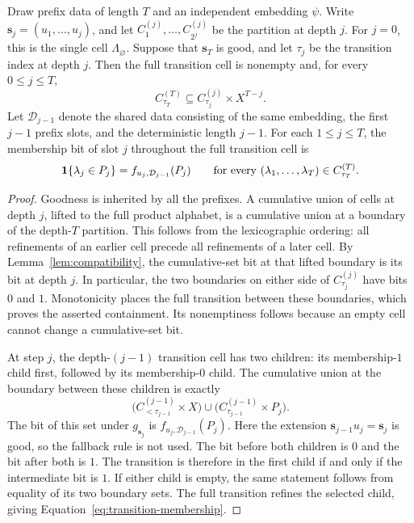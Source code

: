 \begin{lemma}
\label{lem:prefix-refinement}
Draw prefix data of length $T$ and an independent embedding $\psi$.
Write $\mathbf s_j=(u_1,\ldots,u_j)$, and let
$C^{(j)}_1,\ldots,C^{(j)}_{2^j}$ be the partition at depth $j$.
For $j=0$, this is the single cell $\Lambda_{\varnothing}$.
Suppose that $\mathbf s_T$ is good, and let $\tau_j$ be the
transition index at depth $j$.  Then the full transition cell is
nonempty and, for every $0\le j\le T$,
\[
  C^{(T)}_{\tau_T}
  \subseteq C^{(j)}_{\tau_j}\times X^{T-j}.
\]
Let $\mathcal D_{j-1}$ denote the shared data consisting of the same
embedding, the first $j-1$ prefix slots, and the deterministic length
$j-1$.  For each $1\le j\le T$, the membership bit of slot $j$
throughout the full transition cell is
\begin{equation}
  \mathbf 1\{\lambda_j\in P_j\}
  =f_{u_j,\mathcal D_{j-1}}(P_j)
  \qquad
  \text{for every }
  (\lambda_1,\ldots,\lambda_T)\in C^{(T)}_{\tau_T}.
  \label{eq:transition-membership}
\end{equation}
\end{lemma}

\begin{proof}
Goodness is inherited by all the prefixes.  A cumulative union of
cells at depth $j$, lifted to the full product alphabet, is a
cumulative union at a boundary of the depth-$T$ partition.  This
follows from the lexicographic ordering: all refinements of an
earlier cell precede all refinements of a later cell.  By
Lemma~\ref{lem:compatibility}, the cumulative-set bit at that lifted
boundary is its bit at depth $j$.  In particular, the two boundaries
on either side of $C^{(j)}_{\tau_j}$ have bits $0$ and $1$.
Monotonicity places the full transition between these boundaries,
which proves the asserted containment.  Its nonemptiness follows
because an empty cell cannot change a cumulative-set bit.

At step $j$, the depth-$(j-1)$ transition cell has two children:
its membership-$1$ child first, followed by its membership-$0$
child.  The cumulative union at the boundary between these children
is exactly
\[
  \bigl(C^{(j-1)}_{<\tau_{j-1}}\times X\bigr)
  \cup
  \bigl(C^{(j-1)}_{\tau_{j-1}}\times P_j\bigr).
\]
The bit of this set under $g_{\mathbf s_j}$ is
$f_{u_j,\mathcal D_{j-1}}(P_j)$.  Here the extension
$\mathbf s_{j-1}u_j=\mathbf s_j$ is good, so the fallback rule is
not used.  The bit before both children is $0$ and the bit after
both is $1$.  The transition is therefore in the first child if
and only if the intermediate bit is $1$.  If either child is
empty, the same statement follows from equality of its two
boundary sets.  The full transition refines the selected child,
giving Equation~\eqref{eq:transition-membership}.
\end{proof}

